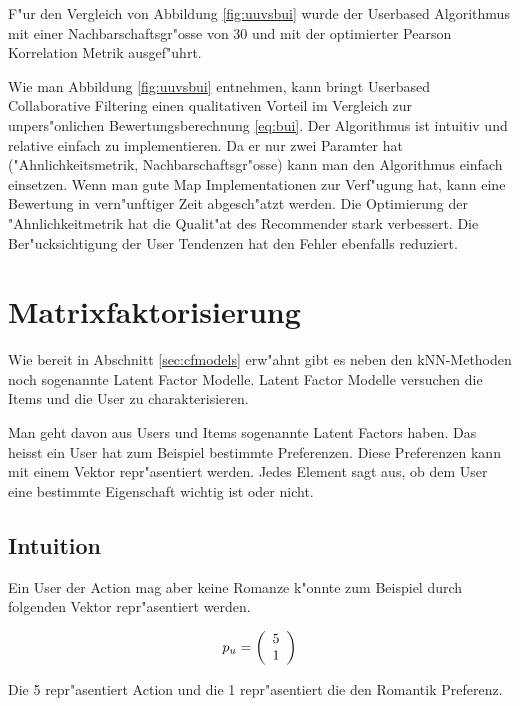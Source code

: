 \documentclass[a4paper, 12pt]{article}
\begin{document}
F"ur den Vergleich von Abbildung \ref{fig:uuvsbui} wurde der Userbased Algorithmus mit einer Nachbarschaftsgr"osse von 30 und mit der optimierter Pearson Korrelation Metrik ausgef"uhrt. 

Wie man Abbildung \ref{fig:uuvsbui} entnehmen, kann bringt Userbased Collaborative Filtering einen qualitativen Vorteil im Vergleich zur unpers"onlichen Bewertungsberechnung \ref{eq:bui}. Der Algorithmus ist intuitiv und relative einfach zu implementieren. Da er nur zwei Paramter hat ("Ahnlichkeitsmetrik, Nachbarschaftsgr"osse) kann man den Algorithmus einfach einsetzen. Wenn man gute Map Implementationen zur Verf"ugung hat, kann eine Bewertung in vern"unftiger Zeit abgesch"atzt werden.
Die Optimierung der "Ahnlichkeitmetrik hat die Qualit"at des Recommender stark verbessert. Die Ber"ucksichtigung der User Tendenzen hat den Fehler ebenfalls reduziert.

\section{Matrixfaktorisierung}
\label{sec:matrixfactorization}

Wie bereit in Abschnitt \ref{sec:cfmodels} erw"ahnt gibt es neben den kNN-Methoden noch sogenannte Latent Factor Modelle. Latent Factor Modelle versuchen die Items und die User zu charakterisieren. 

Man geht davon aus Users und Items sogenannte Latent Factors haben. Das heisst ein User hat zum Beispiel bestimmte Preferenzen. Diese Preferenzen kann mit einem Vektor repr"asentiert werden. Jedes Element sagt aus, ob dem User eine bestimmte Eigenschaft wichtig ist oder nicht. 


\subsection{Intuition}
\label{sec:intuition}

Ein User der Action mag aber keine Romanze k"onnte zum Beispiel durch folgenden Vektor repr"asentiert werden.

\begin{equation}
  \label{eq:vektor}
  p_u = \left(
  \begin{array}[c]{c}
    5 \\
    1 
  \end{array}
\right)
\end{equation}

Die 5 repr"asentiert Action und die 1 repr"asentiert die den Romantik Preferenz.
\end{document}
